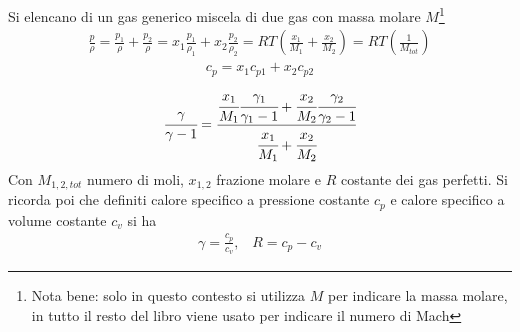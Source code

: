Si elencano di un gas generico miscela di due gas con massa molare $M$\footnote{Nota bene: solo in questo contesto si utilizza $M$ per indicare la massa molare, in tutto il resto del libro viene usato per indicare il numero di Mach}
\begin{align*}
\frac{p}{\rho} = \frac{p_1}{\rho} + \frac{p_2}{\rho} = x_1  \frac{p_1}{\rho_1} + x_2  \frac{p_2}{\rho_2} = RT \left( \frac{x_1}{M_1} + \frac{x_2}{M_2} \right) = RT(\frac{1}{M_{tot}})
\end{align*}
\begin{align*}
c_p = x_1 c_{p1} + x_2 c_{p2}
\end{align*}
\begin{align*}
\cfrac{\gamma}{\gamma -1} = \cfrac{\cfrac{x_1}{M_1} \cfrac{\gamma_1}{\gamma_1 -1}+\cfrac{x_2}{M_2} \cfrac{\gamma_2}{\gamma_2 -1}}{\cfrac{x_1}{M_1}+\cfrac{x_2}{M_2}}
\end{align*}
Con $M_{1,2,tot}$ numero di moli, $x_{1,2}$ frazione molare e $R$ costante dei gas perfetti. Si ricorda poi che definiti calore specifico a pressione costante $c_p$ e calore specifico a volume costante $c_v$ si ha
\begin{align*}
\gamma = \frac{c_p}{c_v}, \;\;\; R = c_p - c_v
\end{align*}


